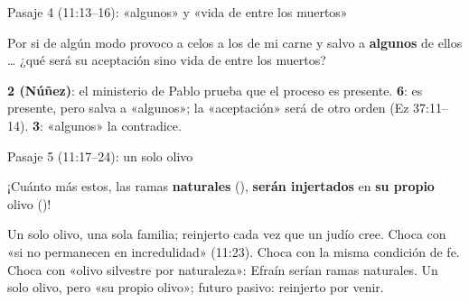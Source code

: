 \begin{frame}{Pasaje 4 (11:13--16): «algunos» y «vida de entre los muertos»}
\begin{cita}[fontupper=\scriptsize\itshape]Por si de algún modo provoco a celos a los de mi carne y salvo a \textbf{algunos} de ellos \ldots{} ¿qué será su aceptación sino vida de entre los muertos?\end{cita}
\centering\scriptsize
{}\elabpropia\vspace{4pt}
\raggedright\scriptsize
\textbf{2 (Núñez)}: el ministerio de Pablo prueba que el proceso es presente. \textbf{6}: es presente, pero salva a «algunos»; la «aceptación» será de otro orden (Ez 37:11--14). \textbf{3}: «algunos» la contradice.
\end{frame}

\begin{frame}{Pasaje 5 (11:17--24): un solo olivo}
\begin{cita}[fontupper=\scriptsize\itshape]¡Cuánto más estos, las ramas \textbf{naturales} (), \textbf{serán injertados} en \textbf{su propio} olivo ()!\end{cita}
%
{Un solo olivo, una sola familia; reinjerto cada vez que un judío cree.}%
{Choca con «si no permanecen en incredulidad» (11:23).}%
{Choca con la misma condición de fe.}%
{Choca con «olivo silvestre por naturaleza»: Efraín serían ramas naturales.}%
{Un solo olivo, pero «su propio olivo»; futuro pasivo: reinjerto por venir.}
\par\vspace{2pt}
\end{frame}

